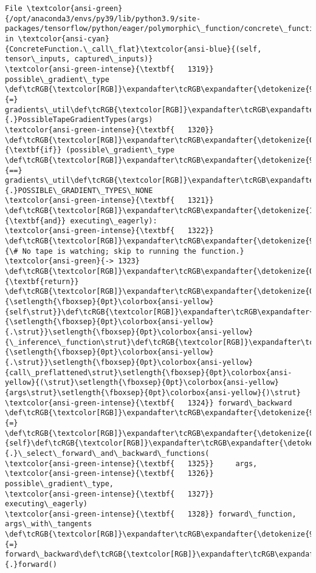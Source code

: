 \documentclass[11pt]{article}
\begin{document}
\begin{Verbatim}[commandchars=\\\{\}, frame=single, framerule=2mm, rulecolor=\color{outerrorbackground}]
File \textcolor{ansi-green}{/opt/anaconda3/envs/py39/lib/python3.9/site-packages/tensorflow/python/eager/polymorphic\_function/concrete\_function.py:1323}, in \textcolor{ansi-cyan}{ConcreteFunction.\_call\_flat}\textcolor{ansi-blue}{(self, tensor\_inputs, captured\_inputs)}
\textcolor{ansi-green-intense}{\textbf{   1319}} possible\_gradient\_type \def\tcRGB{\textcolor[RGB]}\expandafter\tcRGB\expandafter{\detokenize{98,98,98}}{=} gradients\_util\def\tcRGB{\textcolor[RGB]}\expandafter\tcRGB\expandafter{\detokenize{98,98,98}}{.}PossibleTapeGradientTypes(args)
\textcolor{ansi-green-intense}{\textbf{   1320}} \def\tcRGB{\textcolor[RGB]}\expandafter\tcRGB\expandafter{\detokenize{0,135,0}}{\textbf{if}} (possible\_gradient\_type \def\tcRGB{\textcolor[RGB]}\expandafter\tcRGB\expandafter{\detokenize{98,98,98}}{==} gradients\_util\def\tcRGB{\textcolor[RGB]}\expandafter\tcRGB\expandafter{\detokenize{98,98,98}}{.}POSSIBLE\_GRADIENT\_TYPES\_NONE
\textcolor{ansi-green-intense}{\textbf{   1321}}     \def\tcRGB{\textcolor[RGB]}\expandafter\tcRGB\expandafter{\detokenize{175,0,255}}{\textbf{and}} executing\_eagerly):
\textcolor{ansi-green-intense}{\textbf{   1322}}   \def\tcRGB{\textcolor[RGB]}\expandafter\tcRGB\expandafter{\detokenize{95,135,135}}{\# No tape is watching; skip to running the function.}
\textcolor{ansi-green}{-> 1323}   \def\tcRGB{\textcolor[RGB]}\expandafter\tcRGB\expandafter{\detokenize{0,135,0}}{\textbf{return}} \def\tcRGB{\textcolor[RGB]}\expandafter\tcRGB\expandafter{\detokenize{0,135,0}}{\setlength{\fboxsep}{0pt}\colorbox{ansi-yellow}{self\strut}}\def\tcRGB{\textcolor[RGB]}\expandafter\tcRGB\expandafter{\detokenize{98,98,98}}{\setlength{\fboxsep}{0pt}\colorbox{ansi-yellow}{.\strut}}\setlength{\fboxsep}{0pt}\colorbox{ansi-yellow}{\_inference\_function\strut}\def\tcRGB{\textcolor[RGB]}\expandafter\tcRGB\expandafter{\detokenize{98,98,98}}{\setlength{\fboxsep}{0pt}\colorbox{ansi-yellow}{.\strut}}\setlength{\fboxsep}{0pt}\colorbox{ansi-yellow}{call\_preflattened\strut}\setlength{\fboxsep}{0pt}\colorbox{ansi-yellow}{(\strut}\setlength{\fboxsep}{0pt}\colorbox{ansi-yellow}{args\strut}\setlength{\fboxsep}{0pt}\colorbox{ansi-yellow}{)\strut}
\textcolor{ansi-green-intense}{\textbf{   1324}} forward\_backward \def\tcRGB{\textcolor[RGB]}\expandafter\tcRGB\expandafter{\detokenize{98,98,98}}{=} \def\tcRGB{\textcolor[RGB]}\expandafter\tcRGB\expandafter{\detokenize{0,135,0}}{self}\def\tcRGB{\textcolor[RGB]}\expandafter\tcRGB\expandafter{\detokenize{98,98,98}}{.}\_select\_forward\_and\_backward\_functions(
\textcolor{ansi-green-intense}{\textbf{   1325}}     args,
\textcolor{ansi-green-intense}{\textbf{   1326}}     possible\_gradient\_type,
\textcolor{ansi-green-intense}{\textbf{   1327}}     executing\_eagerly)
\textcolor{ansi-green-intense}{\textbf{   1328}} forward\_function, args\_with\_tangents \def\tcRGB{\textcolor[RGB]}\expandafter\tcRGB\expandafter{\detokenize{98,98,98}}{=} forward\_backward\def\tcRGB{\textcolor[RGB]}\expandafter\tcRGB\expandafter{\detokenize{98,98,98}}{.}forward()


\end{Verbatim}
\end{document}
